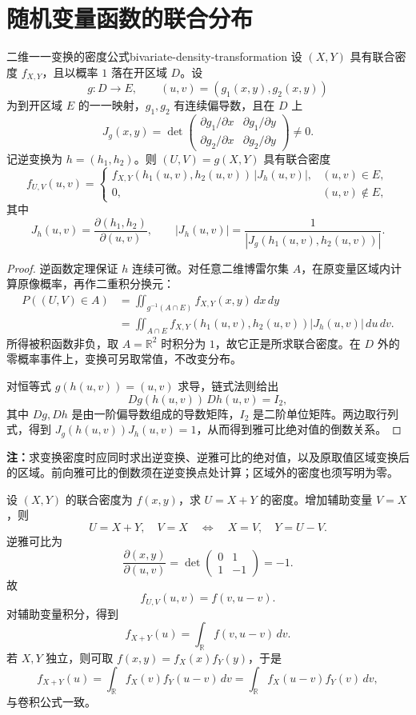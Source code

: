 \section{随机变量函数的联合分布}
\label{sec:joint-distribution-transformations}

\begin{mytheorem}{二维一一变换的密度公式}{bivariate-density-transformation}
设 $(X,Y)$ 具有联合密度 $f_{X,Y}$，且以概率 $1$ 落在开区域 $D$。设
\[
g:D\to E,\qquad (u,v)=(g_1(x,y),g_2(x,y))
\]
为到开区域 $E$ 的一一映射，$g_1,g_2$ 有连续偏导数，且在 $D$ 上
\[
J_g(x,y)=\det
\begin{pmatrix}
\partial g_1/\partial x&\partial g_1/\partial y\\
\partial g_2/\partial x&\partial g_2/\partial y
\end{pmatrix}\ne0.
\]
记逆变换为 $h=(h_1,h_2)$。则 $(U,V)=g(X,Y)$ 具有联合密度
\[
f_{U,V}(u,v)=
\begin{cases}
f_{X,Y}(h_1(u,v),h_2(u,v))\,|J_h(u,v)|,&(u,v)\in E,\\
0,&(u,v)\notin E,
\end{cases}
\]
其中
\[
J_h(u,v)=\frac{\partial(h_1,h_2)}{\partial(u,v)},\qquad
|J_h(u,v)|=\frac1{|J_g(h_1(u,v),h_2(u,v))|}.
\]
\end{mytheorem}
\begin{proof}
逆函数定理保证 $h$ 连续可微。对任意二维博雷尔集 $A$，在原变量区域内计算原像概率，再作二重积分换元：
\begin{align*}
P((U,V)\in A)
&=\iint_{g^{-1}(A\cap E)}f_{X,Y}(x,y)\,dx\,dy\\
&=\iint_{A\cap E}f_{X,Y}(h_1(u,v),h_2(u,v))
 |J_h(u,v)|\,du\,dv.
\end{align*}
所得被积函数非负，取 $A=\mathbb R^2$ 时积分为 $1$，故它正是所求联合密度。在 $D$ 外的零概率事件上，变换可另取常值，不改变分布。

对恒等式 $g(h(u,v))=(u,v)$ 求导，链式法则给出
\[
Dg(h(u,v))\,Dh(u,v)=I_2,
\]
其中 $Dg,Dh$ 是由一阶偏导数组成的导数矩阵，$I_2$ 是二阶单位矩阵。两边取行列式，得到 $J_g(h(u,v))J_h(u,v)=1$，从而得到雅可比绝对值的倒数关系。
\end{proof}

\textbf{注：}\quad 求变换密度时应同时求出逆变换、逆雅可比的绝对值，以及原取值区域变换后的区域。前向雅可比的倒数须在逆变换点处计算；区域外的密度也须写明为零。

\begin{example}[引入辅助变量求和的密度]
设 $(X,Y)$ 的联合密度为 $f(x,y)$，求 $U=X+Y$ 的密度。增加辅助变量 $V=X$，则
\[
U=X+Y,\quad V=X
\quad\Longleftrightarrow\quad
X=V,\quad Y=U-V.
\]
逆雅可比为
\[
\frac{\partial(x,y)}{\partial(u,v)}
=\det\begin{pmatrix}0&1\\1&-1\end{pmatrix}=-1.
\]
故
\[
f_{U,V}(u,v)=f(v,u-v).
\]
对辅助变量积分，得到
\[
f_{X+Y}(u)=\int_{\mathbb R}f(v,u-v)\,dv.
\]
若 $X,Y$ 独立，则可取 $f(x,y)=f_X(x)f_Y(y)$，于是
\[
f_{X+Y}(u)=\int_{\mathbb R}f_X(v)f_Y(u-v)\,dv
=\int_{\mathbb R}f_X(u-v)f_Y(v)\,dv,
\]
与卷积公式一致。
\end{example}

